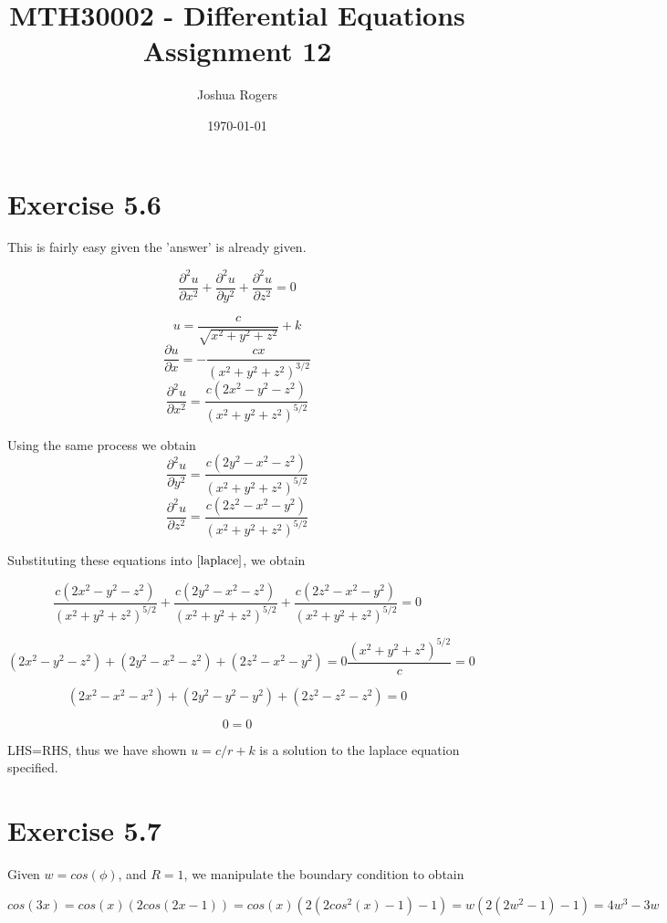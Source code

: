 \documentclass{article}
\title{\vspace{-4cm}MTH30002 - Differential Equations Assignment 12}
\author{Joshua Rogers}
\date\today
\begin{document}
\maketitle

\section*{Exercise 5.6}

This is fairly easy given the 'answer' is already given.

\begin{equation}\label{laplace}
\frac{\partial^2 u}{\partial x^2} + \frac{\partial^2 u}{\partial y^2} +\frac{\partial^2 u}{\partial z^2} = 0
\end{equation}

$$u = \frac{c}{\sqrt{x^2+y^2+z^2}} + k$$
$$\frac{\partial u}{\partial x} = -\frac{cx}{\left(x^2+y^2+z^2\right)^{3/2}}$$
$$\frac{\partial^2 u}{\partial x^2} = \frac{c\left(2x^2-y^2-z^2\right)}{\left(x^2+y^2+z^2\right)^{5/2}}$$

Using the same process we obtain
$$\frac{\partial^2 u}{\partial y^2} = \frac{c\left(2y^2-x^2-z^2\right)}{\left(x^2+y^2+z^2\right)^{5/2}}$$
$$\frac{\partial^2 u}{\partial z^2} = \frac{c\left(2z^2-x^2-y^2\right)}{\left(x^2+y^2+z^2\right)^{5/2}}$$

Substituting these equations into $\eqref{laplace}$, we obtain

$$ \frac{c\left(2x^2-y^2-z^2\right)}{\left(x^2+y^2+z^2\right)^{5/2}} + \frac{c\left(2y^2-x^2-z^2\right)}{\left(x^2+y^2+z^2\right)^{5/2}} + \frac{c\left(2z^2-x^2-y^2\right)}{\left(x^2+y^2+z^2\right)^{5/2}} = 0$$

$$(2x^2-y^2-z^2) + (2y^2-x^2-z^2) + (2z^2-x^2-y^2) = 0 \frac{\left(x^2+y^2+z^2\right)^{5/2}}{c} = 0$$

$$(2x^2-x^2-x^2) + (2y^2-y^2-y^2) + (2z^2-z^2-z^2) = 0$$

$$0=0$$

LHS=RHS, thus we have shown $u=c/r+k$ is a solution to the laplace equation specified.

\section*{Exercise 5.7}

Given $w=cos(\phi)$, and $R=1$, we manipulate the boundary condition to obtain

$$cos(3x) = cos(x)(2cos(2x-1)) = cos(x)(2(2cos^2(x)-1)-1) = w(2(2w^2-1)-1) = 4w^3 -3w$$
\end{document}
